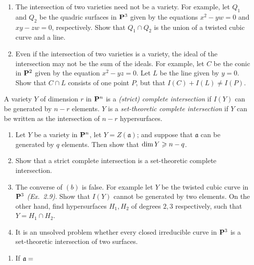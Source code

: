 \documentclass[10pt]{amsart}
\begin{document}
\begin{solution}
    
\end{solution}

\begin{exercise}[2.16]
    \begin{enumerate}
        \item The intersection of two varieties need not be a variety. For example,
        let $Q_1$ and $Q_2$ be the quadric surfaces in ${\bf P}^3$ given by the
        equations $x^2-yw = 0$ and $xy - zw =0$, respectively. Show that $Q_1 \cap
        Q_2$ is the union of a twisted cubic curve and a line.
        
        \item Even if the intersection of two varieties is a variety, the ideal of the
        intersection may not be the sum of the ideals. For example, let $C$ be the
        conic in ${\bf P}^2$ given by the equation $x^2-yz = 0$. Let $L$ be the line
        given by $y = 0$. Show that $C \cap L$ consists of one point $P$, but that
        $I(C) + I(L) \ne I(P)$. 
    \end{enumerate}
\end{exercise}

\begin{solution}
    
\end{solution}

\begin{exercise}[2.17]
    A variety $Y$ of dimension $r$ in ${\bf P}^n$ is a \emph{(strict) complete
    intersection} if $I(Y)$ can be generated by $n-r$ elements. $Y$ is a
    \emph{set-theoretic complete intersection} if $Y$ can be written as the
    intersection of $n-r$ hypersurfaces.
    \begin{enumerate}
    \item Let $Y$ be a variety in ${\bf P}^n$, let $Y = Z(\mathfrak{a})$; and
    suppose that $\mathfrak{a}$ can be generated by $q$ elements. Then show
    that $\operatorname{\rm{dim}} Y \geqslant n-q$. 
    \item Show that a strict complete intersection is a set-theoretic complete
    intersection.
    \item The converse of $(b)$ is false. For example let $Y$ be the twisted
    cubic curve in ${\bf P}^3$ {\emph{(Ex.\ 2.9)}}. Show that
    $I(Y)$ cannot be generated by two elements. On the other hand, find
    hypersurfaces $H_1,H_2$ of degrees $2,3$ respectively, such that
    $Y = H_1 \cap H_2$. 
    \item It is an unsolved problem whether every closed irreducible curve in
    ${\bf P}^3$ is a set-theoretic intersection of two surfaces.
    \end{enumerate}
\end{exercise}

\begin{solution}
\begin{enumerate}
    \item If $\mathfrak{a} = $
\end{enumerate}
\end{solution}
\end{document}
